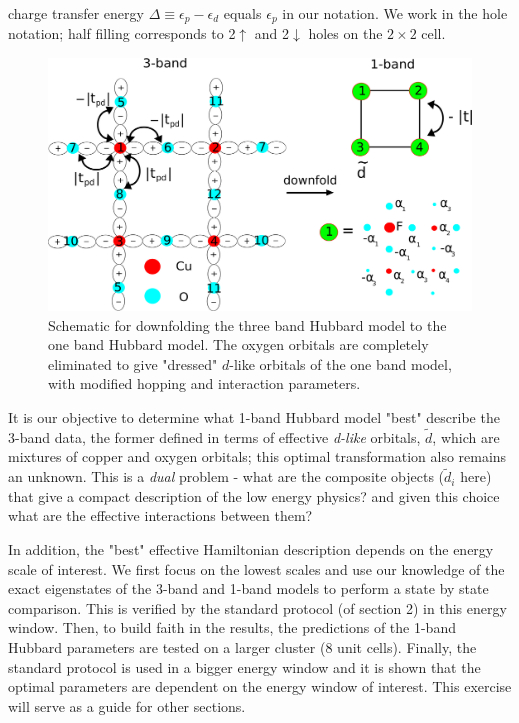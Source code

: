 charge transfer energy $\Delta \equiv \epsilon_p - \epsilon_d$ equals $\epsilon_p$ in our notation. 
We work in the hole notation; half filling corresponds to 2$\uparrow$ and 2$\downarrow$ holes on the $2\times2$ cell.
\begin{figure}[htpb]
\centering
\includegraphics[width=0.8\linewidth]{./Figures/three_band_figure.eps}
\caption{Schematic for downfolding the three band Hubbard model to the one band Hubbard model. 
The oxygen orbitals are completely eliminated to give "dressed" $d$-like orbitals of the one band model, with modified hopping 
and interaction parameters.}
\label{fig:threeband} 
\end{figure}	

It is our objective to determine what 1-band Hubbard model "best" describe the 3-band data, the former defined 
in terms of effective \textit{d-like} orbitals, $\tilde{d}$, which are mixtures of copper and oxygen orbitals; 
this optimal transformation also remains an unknown. This is a \emph{dual} problem - what are the composite objects 
($\tilde{d}_i$ here) that give a compact description of the low energy physics? and given this choice what 
are the effective interactions between them?

In addition, the "best" effective Hamiltonian description depends on the energy scale of interest. 
We first focus on the lowest scales and use our knowledge of the exact 
eigenstates of the 3-band and 1-band models to perform a state by state comparison. 
This is verified by the standard protocol (of section 2) in this energy window. Then, to build faith 
in the results, the predictions of the 1-band Hubbard parameters are tested on a larger cluster (8 unit cells). 
Finally, the standard protocol is used in a bigger energy window and it is shown that the optimal 
parameters are dependent on the energy window of interest. This exercise will serve 
as a guide for other sections. 

